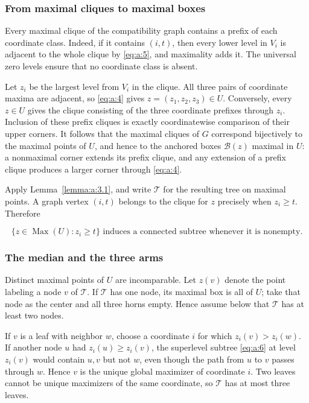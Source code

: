 \subsubsection{From maximal cliques to maximal boxes}

Every maximal clique of the compatibility graph contains a prefix of each
coordinate class. Indeed, if it contains \((i,t)\), then every lower level in
\(V_i\) is adjacent to the whole clique by \eqref{eq:a:5}, and maximality adds it.
The universal zero levels ensure that no coordinate class is absent.

Let \(z_i\) be the largest level from \(V_i\) in the clique. All three pairs
of coordinate maxima are adjacent, so \eqref{eq:a:4} gives \(z=(z_1,z_2,z_3)\in U\).
Conversely, every \(z\in U\) gives the clique consisting of the three
coordinate prefixes through \(z_i\). Inclusion of these prefix cliques is
exactly coordinatewise comparison of their upper corners. It follows that
the maximal cliques of \(G\) correspond bijectively to the maximal points
of \(U\), and hence to the anchored boxes \(\mathcal B(z)\) maximal in
\(U\): a nonmaximal corner extends its prefix clique, and any extension of a
prefix clique produces a larger corner through \eqref{eq:a:4}.

Apply Lemma~\ref{lemma:a:3.1}, and write \(\mathcal T\) for the resulting tree on maximal
points. A graph vertex \((i,t)\) belongs to the clique for \(z\) precisely
when \(z_i\ge t\). Therefore

\begin{equation}
\boxed{
\{z\in\operatorname{Max}(U):z_i\ge t\}
\text{ induces a connected subtree whenever it is nonempty.}
}
\label{eq:a:6}
\end{equation}

\subsubsection{The median and the three arms}

Distinct maximal points of \(U\) are incomparable. Let \(z(v)\) denote the
point labeling a node \(v\) of \(\mathcal T\).
If \(\mathcal T\) has one node, its maximal box is all of \(U\); take that
node as the center and all three horns empty. Hence assume below that
\(\mathcal T\) has at least two nodes.

If \(v\) is a leaf with neighbor \(w\), choose a coordinate \(i\) for which
\(z_i(v)>z_i(w)\). If another node \(u\) had \(z_i(u)\ge z_i(v)\), the
superlevel subtree \eqref{eq:a:6} at level \(z_i(v)\) would contain \(u,v\) but not
\(w\), even though the path from \(u\) to \(v\) passes through \(w\).
Hence \(v\) is the unique global maximizer of coordinate \(i\). Two leaves
cannot be unique maximizers of the same coordinate, so \(\mathcal T\) has at
most three leaves.

